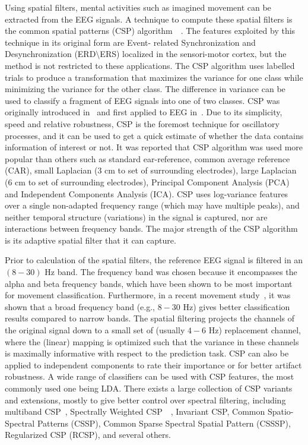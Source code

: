 Using spatial filters, mental activities such as imagined movement can be extracted from the EEG signals. A 
technique to compute these spatial filters is the common spatial patterns (CSP) algorithm~\cite{10}~\cite{11}. The features exploited by this technique in its original form are Event- related Synchronization and Desynchronization (ERD$\setminus$ERS) localized in the sensori-motor cortex, but the method is not restricted to these applications. The CSP algorithm uses labelled trials to produce a transformation that maximizes the variance for one class while minimizing the variance for the 
other class. The difference in variance can be used to classify a fragment of EEG signals into one of two classes. 
CSP was originally introduced in~\cite{12} and first applied to EEG in~\cite{13}. Due to its simplicity, speed and 
relative robustness, CSP is the foremost technique for oscillatory processes, and it can be used to get a quick 
estimate of whether the data contains information of interest or not. It was reported that CSP algorithm was used 
more popular than others such as standard ear-reference, common average reference (CAR), small Laplacian (3 cm to set of surrounding electrodes), large Laplacian (6 cm to set of surrounding electrodes), Principal Component Analysis (PCA) and Independent Components Analysis (ICA). CSP uses log-variance features over a single non-adapted frequency range (which may have multiple peaks), and neither temporal structure (variations) in the signal is captured, nor are interactions between frequency bands. The major strength of the CSP algorithm is its adaptive spatial filter that it can capture. 

Prior to calculation of the spatial filters, the reference EEG signal is filtered in an $(8-30)$ Hz band. The frequency band was chosen because it encompasses the alpha and beta frequency bands, which have been shown to be most important for movement classification. Furthermore, in a recent movement study~\cite{14}, it was shown that a broad frequency band (e.g., $8-30$ Hz) gives better classification results compared to narrow bands.  The spatial filtering projects the channels of the original signal down to a small set of (usually $4-6$ Hz) replacement channel, where the (linear) mapping is optimized such that the variance in these channels is maximally informative with respect to the prediction task. CSP can also be applied to independent components to rate their importance or for better artifact robustness. A wide range of classifiers can be used with CSP features, the most commonly used one being LDA. There exists a large collection of CSP variants and extensions, mostly to give better control over spectral filtering, including multiband CSP~\cite{15}, Spectrally Weighted CSP~\cite{16}~\cite{17}, Invariant CSP, Common Spatio-Spectral Patterns (CSSP), Common Sparse Spectral Spatial Pattern (CSSSP), Regularized CSP (RCSP), and several others. 

